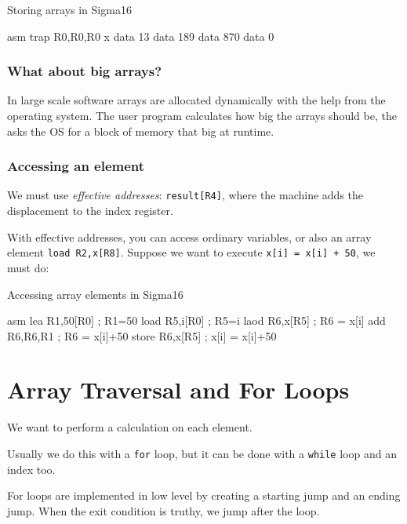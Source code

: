 \begin{highlight}{Storing arrays in Sigma16}
    \begin{code}{asm}
        trap R0,R0,R0
        x data 13
        data 189
        data 870
        data 0
    \end{code}
\end{highlight}

\subsubsection{What about big arrays?}\label{ssub:what_about_big_arrays}

In large scale software arrays are allocated dynamically with the help from the operating system.
The user program calculates how big the arrays should be, the asks the OS for a block of memory that big at runtime.

\subsubsection{Accessing an element}\label{ssub:accessing_an_element}

We must use \emph{effective addresses}: \texttt{result[R4]}, where the machine adds the displacement to the index register.

With effective addresses, you can access ordinary variables, or also an array element \texttt{load R2,x[R8]}.
Suppose we want to execute \texttt{x[i] = x[i] + 50}, we must do:
\begin{highlight}{Accessing array elements in Sigma16}
    \begin{code}{asm}
        lea R1,50[R0] ; R1=50
        load R5,i[R0] ; R5=i
        laod R6,x[R5] ; R6 = x[i]
        add R6,R6,R1 ; R6 = x[i]+50
        store R6,x[R5] ; x[i] = x[i]+50
    \end{code}
\end{highlight}

\section{Array Traversal and For Loops}\label{sec:array_traversal_and_for_loops}

We want to perform a calculation on each element.

Usually we do this with a \texttt{for} loop, but it can be done with a \texttt{while} loop and an index too.

For loops are implemented in low level by creating a starting jump and an ending jump.
When the exit condition is truthy, we jump after the loop.

